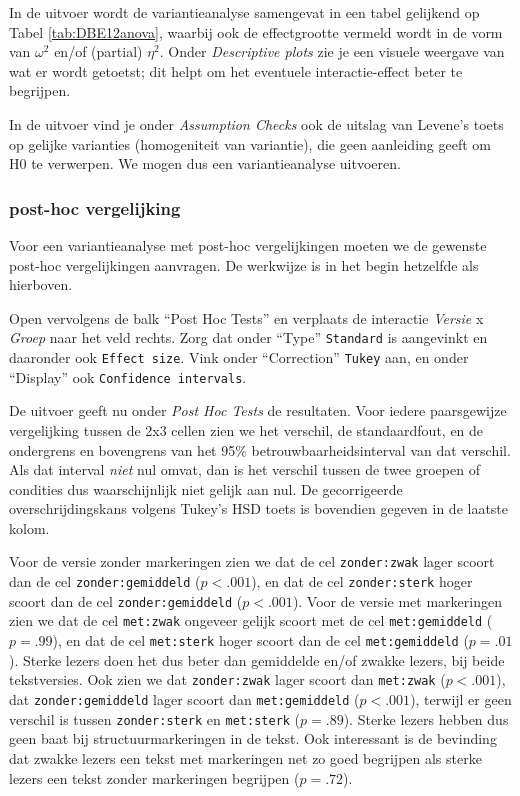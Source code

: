 \documentclass[
]{book}
\begin{document}
In de uitvoer wordt de variantieanalyse samengevat in een tabel gelijkend op Tabel \ref{tab:DBE12anova}, waarbij ook de effectgrootte vermeld wordt in de vorm van \(\omega^2\) en/of (partial) \(\eta^2\). Onder \emph{Descriptive plots} zie je een visuele weergave van wat er wordt getoetst; dit helpt om het eventuele interactie-effect beter te begrijpen.

In de uitvoer vind je onder \emph{Assumption Checks} ook de uitslag van Levene's toets op gelijke
varianties (homogeniteit van variantie), die geen aanleiding geeft om H0
te verwerpen. We mogen dus een variantieanalyse uitvoeren.

\subsubsection{post-hoc vergelijking}\label{post-hoc-vergelijking-2}

Voor een variantieanalyse met post-hoc vergelijkingen moeten we de
gewenste post-hoc vergelijkingen aanvragen. De werkwijze is in het begin
hetzelfde als hierboven.

Open vervolgens de balk ``Post Hoc Tests'' en verplaats de interactie \emph{Versie} x \emph{Groep} naar het veld rechts. Zorg dat onder ``Type'' \texttt{Standard} is aangevinkt en daaronder ook \texttt{Effect\ size}. Vink onder ``Correction'' \texttt{Tukey} aan, en onder ``Display'' ook \texttt{Confidence\ intervals}.

De uitvoer geeft nu onder \emph{Post Hoc Tests} de resultaten.
Voor iedere paarsgewijze vergelijking tussen de 2x3 cellen zien we het verschil, de standaardfout, en de ondergrens en bovengrens van het 95\% betrouwbaarheidsinterval van dat verschil.
Als dat interval \emph{niet} nul omvat, dan is het verschil tussen de twee
groepen of condities dus waarschijnlijk niet gelijk aan nul. De
gecorrigeerde overschrijdingskans volgens Tukey's HSD toets is bovendien
gegeven in de laatste kolom.

Voor de versie zonder markeringen zien we dat de cel \texttt{zonder:zwak} lager scoort dan de cel \texttt{zonder:gemiddeld} (\(p<.001\)), en dat de cel \texttt{zonder:sterk} hoger scoort dan de cel \texttt{zonder:gemiddeld} (\(p<.001\)).
Voor de versie met markeringen zien we dat de cel \texttt{met:zwak} ongeveer gelijk scoort met de cel \texttt{met:gemiddeld} (\(p=.99\)), en dat de cel \texttt{met:sterk} hoger scoort dan de cel \texttt{met:gemiddeld} (\(p=.01\)). Sterke lezers doen het dus beter dan gemiddelde en/of zwakke lezers, bij beide tekstversies.
Ook zien we dat \texttt{zonder:zwak} lager scoort dan \texttt{met:zwak} (\(p<.001\)), dat \texttt{zonder:gemiddeld} lager scoort dan \texttt{met:gemiddeld} (\(p<.001\)), terwijl er geen verschil is tussen \texttt{zonder:sterk} en \texttt{met:sterk} (\(p=.89\)). Sterke lezers hebben dus geen baat bij structuurmarkeringen in de tekst.
Ook interessant is de bevinding dat zwakke lezers een tekst met markeringen net zo goed begrijpen als sterke lezers een tekst zonder markeringen begrijpen (\(p=.72\)).
\end{document}
